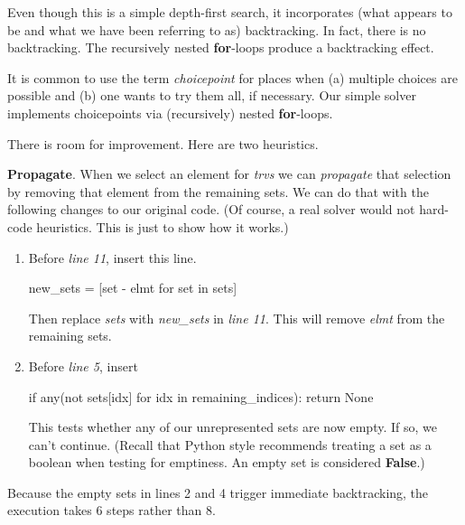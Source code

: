 Even though this is a simple depth-first search, it incorporates (what appears to be and what we have been referring to as) backtracking. In fact, there is no backtracking. The recursively nested \textbf{for}-loops produce a backtracking effect.  

It is common to use the term \textit{choicepoint} for places when (a) multiple choices are possible and (b) one wants to try them all, if necessary. Our simple solver implements choicepoints via (recursively) nested \textbf{for}-loops. 

There is room for improvement. Here are two heuristics. 

\noindent\textbf{Propagate}. When we select an element for \textit{trvs} we can \textit{propagate} that selection by removing that element from the remaining sets. We can do that with the following changes to our original code. (Of course, a real solver would not hard-code heuristics. This is just to show how it works.)
\begin{enumerate}
    \item Before \textit{line 11}, insert this line.
  
\begin{minipage}[c]{0.45\textwidth}
\begin{python1}
new_sets = [set - {elmt} for set in sets]
\end{python1}
\end{minipage}

Then replace \textit{sets} with \textit{new\_sets} in \textit{line 11}.
This will remove \textit{elmt} from the remaining sets.

    \item Before \textit{line 5}, insert

\begin{minipage}[c]{0.45\textwidth}
\begin{python1}
if any(not sets[idx] for idx in remaining_indices):
  return None
\end{python1}
\end{minipage}


This tests whether any of our unrepresented sets are now empty. If so, we can't continue. (Recall that Python style recommends treating a set as a boolean when testing for emptiness. An empty set is considered \textbf{False}.)


\end{enumerate}

Because the empty sets in lines 2 and 4  trigger immediate backtracking, the execution takes 6 steps rather than 8.

